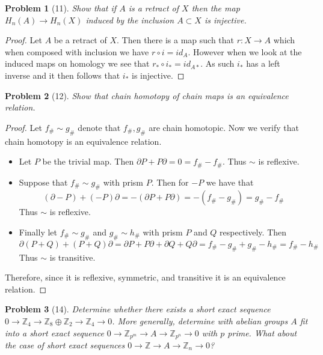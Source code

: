 \documentclass[10pt]{article}
\newcommand{\sk}{\vskip 10mm}
\theoremstyle{plain}
\newtheorem{problem}{Problem}
\theoremstyle{remark}
\begin{document}
\begin{problem}[11]
  Show that if $A$ is a retract of $X$ then the map
  $H_n(A) \to H_n(X)$ induced by the inclusion $A \subset X$
  is injective.
\end{problem}

\begin{proof}
  Let $A$ be a retract of $X$. Then there is a map such that
  $r:X\rightarrow A$ which when composed with inclusion we have
  $r\circ i= id_A$. However when we look at the induced maps on
  homology we see that $r_*\circ i_*=id_{A*}$. As such $i_*$ has
  a left inverse and it then follows that $i_*$ is injective.
\end{proof}

\sk

\begin{problem}[12]
  Show that chain homotopy of chain maps is an equivalence relation.
\end{problem}

\begin{proof}
  Let $f_\#\sim g_\#$ denote that $f_\#,g_\#$ are chain homotopic. Now we verify
  that chain homotopy is an equivalence relation.

  \begin{itemize}
  \item
    Let $P$ be the trivial map. Then $\partial P + P\partial=0=f_\#-f_\#$. Thus
    $\sim$ is reflexive.
  \item
    Suppose that $f_\#\sim g_\#$ with prism $P$. Then for $-P$ we
    have that
    \[(\partial -P)+(-P)\partial = -(\partial P+P\partial)=-(f_\#-g_\#)=g_\#-f_\#\]
    Thus $\sim$ is reflexive.
  \item
    Finally let $f_\#\sim g_\#$ and $g_\#\sim h_\#$ with prism $P$ and $Q$ respectively.
    Then
    \[ \partial(P+Q) +(P+Q)\partial = \partial P + P\partial+\partial Q + Q\partial=f_\#-g_\#+g_\#-h_\#=f_\#-h_\# \]
    Thus $\sim$ is transitive.
  \end{itemize}

  Therefore, since it is reflexive, symmetric, and transitive it is an equivalence relation.
\end{proof}

\sk

\begin{problem}[14]
  Determine whether there exists a short exact sequence
  $0 \to \mathbb{Z}_4 \to \mathbb{Z}_8 \oplus \mathbb{Z}_2 \to \mathbb{Z}_4 \to 0$.
  More generally, determine with abelian groups $A$ fit into a short
  exact sequence $0 \to \mathbb{Z}_{p^m} \to A \to \mathbb{Z}_{p^n} \to 0$ with
  $p$ prime. What about the case of short exact sequences
  $0 \to \mathbb{Z} \to A \to \mathbb{Z}_n \to 0$?
\end{problem}
\end{document}

